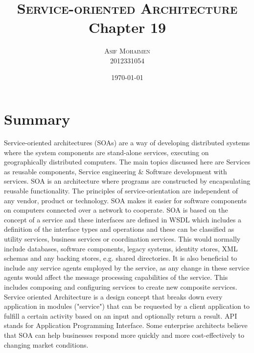 \documentclass[dvips,12pt]{article}
\begin{document}
\title{
  \textsc{Service-oriented Architecture}\\
  Chapter 19
}
\author{
  \textsc{Asif Mohaimen}\\
  2012331054\\
}
\date{\today}

\maketitle


\section{Summary}
Service-oriented architectures (SOAs) are a way of developing distributed
systems where the system components are stand-alone services, executing on geographically distributed computers. The main topics discussed here are Services as reusable components, Service engineering \& Software development with services. SOA is an architecture where programs are constructed by encapsulating reusable functionality.  The principles of service-orientation are independent of any vendor, product or technology. SOA makes it easier for software components on computers connected over a network to cooperate. SOA is based on the concept of a service and these interfaces are defined in WSDL which includes a definition of the interface types and operations and these can be classified as utility services, business services or coordination services. This would normally include databases, software components, legacy systems, identity stores, XML schemas and any backing stores, e.g. shared directories. It is also beneficial to include any service agents employed by the service, as any change in these service agents would affect the message processing capabilities of the service. This includes composing and configuring services to create new composite services. Service oriented Architecture is a design concept that breaks down every application in modules ("service") that can be requested by a client application to fulfill a certain activity based on an input and optionally return a result. API stands for Application Programming Interface. Some enterprise architects believe that SOA can help businesses respond more quickly and more cost-effectively to changing market conditions.
\end{document}
